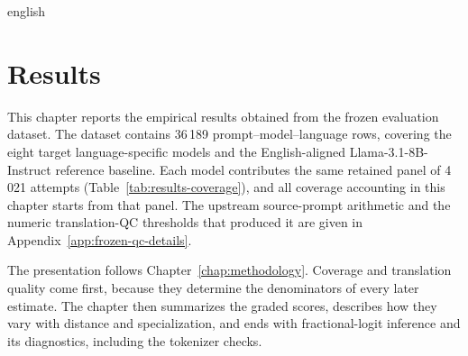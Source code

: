 
\begin{otherlanguage*}{english}


\discardmacros{\AsrHeatmapFigure\DistanceAsrFigure\BelebeleIfHeatmapFigure\SpecAsrFigure}

\chapter{Results}
\label{chap:results}

This chapter reports the empirical results obtained from the frozen evaluation dataset. The dataset contains 36\,189 prompt--model--language rows, covering the eight target language-specific models and the English-aligned Llama-3.1-8B-Instruct reference baseline. Each model contributes the same retained panel of 4\,021 attempts (Table~\ref{tab:results-coverage}), and all coverage accounting in this chapter starts from that panel. The upstream source-prompt arithmetic and the numeric translation-QC thresholds that produced it are given in Appendix~\ref{app:frozen-qc-details}.

The presentation follows Chapter~\ref{chap:methodology}. Coverage and translation quality come first, because they determine the denominators of every later estimate. The chapter then summarizes the graded scores, describes how they vary with distance and specialization, and ends with fractional-logit inference and its diagnostics, including the tokenizer checks.


\end{otherlanguage*}
